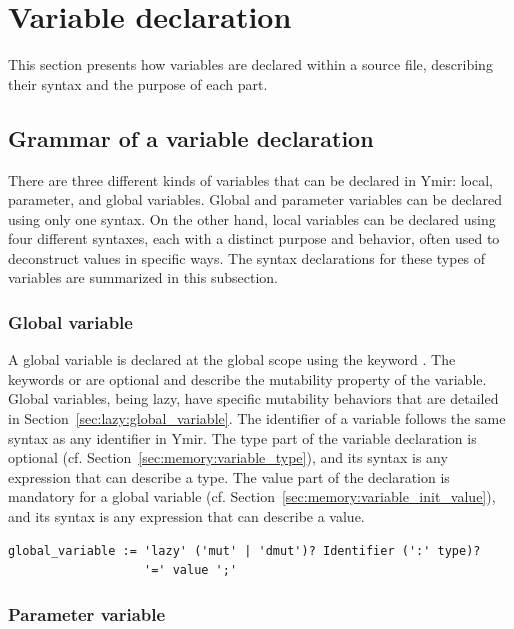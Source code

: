 \section{Variable declaration}
\label{sec:memory:local_variable_declaration}

This section presents how variables are declared within a source file,
describing their syntax and the purpose of each part.

\subsection{Grammar of a variable declaration}

There are three different kinds of variables that can be declared in Ymir:
local, parameter, and global variables. Global and parameter variables can be
declared using only one syntax. On the other hand, local variables can be
declared using four different syntaxes, each with a distinct purpose and
behavior, often used to deconstruct values in specific ways. The syntax
declarations for these types of variables are summarized in this subsection.

\subsubsection*{Global variable}

A global variable is declared at the global scope using the keyword
. The keywords  or  are optional and describe
the mutability property of the variable. Global variables, being lazy, have
specific mutability behaviors that are detailed in
Section~\ref{sec:lazy:global_variable}. The identifier of a variable follows the
same syntax as any identifier in Ymir. The type part of the variable declaration
is optional (cf. Section~\ref{sec:memory:variable_type}), and its syntax is any
expression that can describe a type. The value part of the declaration is
mandatory for a global variable (cf. Section~\ref{sec:memory:variable_init_value}), and
its syntax is any expression that can describe a value.

\begin{lstlisting}[style=grammarVerb]
global_variable := 'lazy' ('mut' | 'dmut')? Identifier (':' type)?
                   '=' value ';'
\end{lstlisting}

\subsubsection*{Parameter variable}

